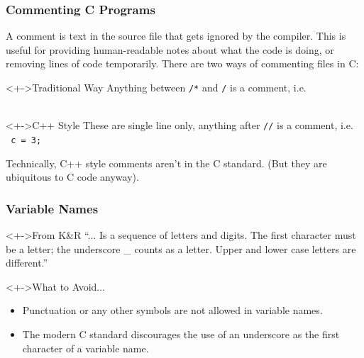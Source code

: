 \documentclass[smaller,handout,table]{beamer}
\begin{document}
\begin{frame}
\frametitle{Commenting C Programs}
A comment is text in the source file that gets ignored by the compiler. This is useful for providing human-readable notes about what the code is doing, or removing lines of code temporarily. There are two ways of commenting files in C:

\begin{block}<+->{Traditional Way}
Anything between {\tt /*} and {\tt */} is a comment, i.e.\\
{\tt {} }\\
{\tt {}}
\end{block}

\begin{block}<+->{C++ Style}
These are single line only, anything after {\tt //} is a comment, i.e.\\
{\tt {} c = 3; }

\begin{alertblock}{}
Technically, C++ style comments aren't in the C standard. (But they are
ubiquitous to C code anyway).
\end{alertblock}
\end{block}

\end{frame}

\begin{frame}
\frametitle{Variable Names}
\begin{block}<+->{From K\&R}
``... Is a sequence of letters and digits. The first character must be a letter; the underscore \_ counts as a letter. Upper and lower case letters are different.''
\end{block}

\begin{alertblock}<+->{What to Avoid$\ldots$}
\begin{itemize}
\item Punctuation or any other symbols are not allowed in variable names.
\item The modern C standard discourages the use of an underscore as the first character of a variable name.
\end{itemize}
\end{alertblock}
\end{frame}
\end{document}
